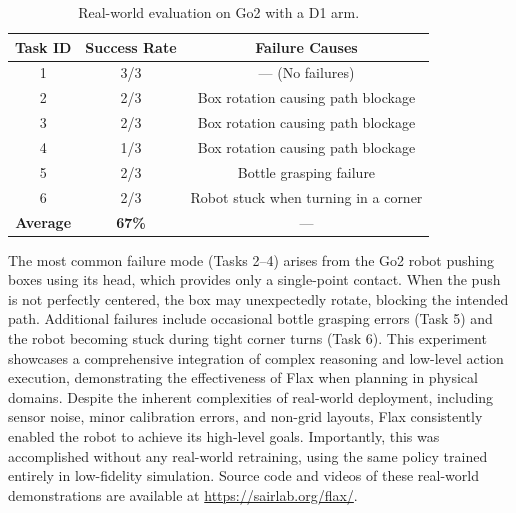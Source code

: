 \documentclass[letterpaper, 10pt, journal, twoside]{IEEEtran}
\newcommand{\shortname}{Flax\xspace}
\begin{document}
\begin{table}[h]
\centering
\caption{Real-world evaluation on Go2 with a D1 arm.}
\label{tab:real_world_results}
\begin{tabular}{c|c|c}
\toprule
\textbf{Task ID} & \textbf{Success Rate} & \textbf{Failure Causes} \\
\midrule
1 & 3/3 & --- (No failures) \\
2 & 2/3 & Box rotation causing path blockage \\
3 & 2/3 & Box rotation causing path blockage \\
4 & 1/3 & Box rotation causing path blockage \\
5 & 2/3 & Bottle grasping failure \\
6 & 2/3 & Robot stuck when turning in a corner \\
\midrule
\textbf{Average} & \textbf{67\%} & --- \\
\bottomrule
\end{tabular}
\end{table}
The most common failure mode (Tasks 2–4) arises from the Go2 robot pushing boxes using its head, which provides only a single-point contact. When the push is not perfectly centered, the box may unexpectedly rotate, blocking the intended path. Additional failures include occasional bottle grasping errors (Task 5) and the robot becoming stuck during tight corner turns (Task 6).
This experiment showcases a comprehensive integration of complex reasoning and low-level action execution, demonstrating the effectiveness of \shortname when planning in physical domains. 
Despite the inherent complexities of real-world deployment, including sensor noise, minor calibration errors, and non-grid layouts, \shortname consistently enabled the robot to achieve its high-level goals. Importantly, this was accomplished without any real-world retraining, using the same policy trained entirely in low-fidelity simulation. 
Source code and videos of these real-world demonstrations are available at \url{https://sairlab.org/flax/}.
\end{document}
